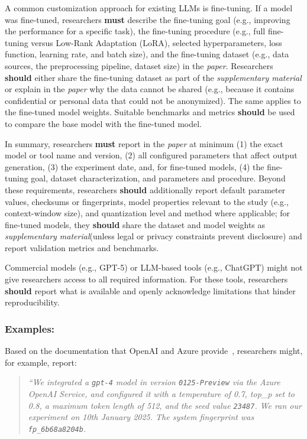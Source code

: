 \documentclass[smallextended]{svjour3}
\newcommand{\must}{\textbf{must}\xspace}
\newcommand{\should}{\textbf{should}\xspace}
\newcommand{\paper}{\emph{paper}\xspace}
\newcommand{\supplementarymaterial}{\emph{supplementary material}\xspace}
\newcommand{\paper}{\emph{paper}\xspace}
\newcommand{\supplementarymaterial}{\emph{supplementary material}\xspace}
\newcommand{\guidelinesubsubsection}[1]{\subsubsection{\bfseries #1:}}
\newcommand{\guidelinesubsubsection}[1]{\subsubsection{#1}}
\begin{document}
A common customization approach for existing LLMs is fine-tuning.
If a model was fine-tuned, researchers \must describe the fine-tuning goal (e.g., improving the performance for a specific task), the fine-tuning procedure (e.g., full fine-tuning versus Low-Rank Adaptation (LoRA), selected hyperparameters, loss function, learning rate, and batch size), and the fine-tuning dataset (e.g., data sources, the preprocessing pipeline, dataset size) in the \paper.
Researchers \should either share the fine-tuning dataset as part of the \supplementarymaterial or explain in the \paper why the data cannot be shared (e.g., because it contains confidential or personal data that could not be anonymized).
The same applies to the fine-tuned model weights.
Suitable benchmarks and metrics \should be used to compare the base model with the fine-tuned model.

In summary, researchers \must report in the \paper at minimum (1) the exact model or tool name and version, (2) all configured parameters that affect output generation, (3) the experiment date, and, for fine-tuned models, (4) the fine-tuning goal, dataset characterization, and parameters and procedure. Beyond these requirements, researchers \should additionally report default parameter values, checksums or fingerprints, model properties relevant to the study (e.g., context-window size), and quantization level and method where applicable; for fine-tuned models, they \should share the dataset and model weights as \supplementarymaterial (unless legal or privacy constraints prevent disclosure) and report validation metrics and benchmarks.

Commercial models (e.g., GPT-5) or LLM-based tools (e.g., ChatGPT) might not give researchers access to all required information.
For these tools, researchers \should report what is available and openly acknowledge limitations that hinder reproducibility.

\guidelinesubsubsection{Examples}

Based on the documentation that OpenAI and Azure provide~\cite{OpenAI25, Azure25}, researchers might, for example, report:

\begin{quote}
\it
 ``We integrated a  \texttt{gpt-4} model in version \texttt{0125-Preview} via the Azure OpenAI Service, and configured it with a temperature of 0.7, top\_p set to 0.8, a maximum token length of 512, and the  seed value \texttt{23487}.
 We ran our experiment on 10th January 2025. The system fingerprint was \texttt{fp\_6b68a8204b}.
\end{quote}
\end{document}
